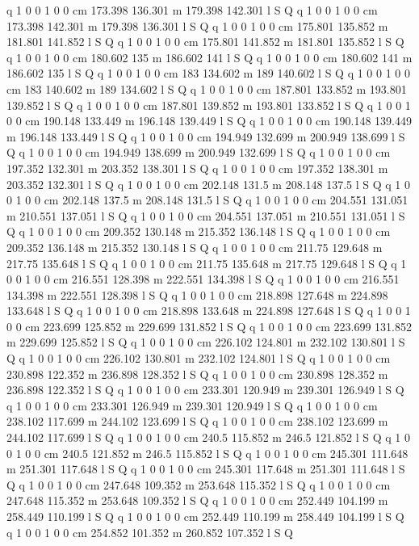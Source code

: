 q 1 0 0 1 0 0 cm
173.398 136.301 m 179.398 142.301 l S Q
q 1 0 0 1 0 0 cm
173.398 142.301 m 179.398 136.301 l S Q
q 1 0 0 1 0 0 cm
175.801 135.852 m 181.801 141.852 l S Q
q 1 0 0 1 0 0 cm
175.801 141.852 m 181.801 135.852 l S Q
q 1 0 0 1 0 0 cm
180.602 135 m 186.602 141 l S Q
q 1 0 0 1 0 0 cm
180.602 141 m 186.602 135 l S Q
q 1 0 0 1 0 0 cm
183 134.602 m 189 140.602 l S Q
q 1 0 0 1 0 0 cm
183 140.602 m 189 134.602 l S Q
q 1 0 0 1 0 0 cm
187.801 133.852 m 193.801 139.852 l S Q
q 1 0 0 1 0 0 cm
187.801 139.852 m 193.801 133.852 l S Q
q 1 0 0 1 0 0 cm
190.148 133.449 m 196.148 139.449 l S Q
q 1 0 0 1 0 0 cm
190.148 139.449 m 196.148 133.449 l S Q
q 1 0 0 1 0 0 cm
194.949 132.699 m 200.949 138.699 l S Q
q 1 0 0 1 0 0 cm
194.949 138.699 m 200.949 132.699 l S Q
q 1 0 0 1 0 0 cm
197.352 132.301 m 203.352 138.301 l S Q
q 1 0 0 1 0 0 cm
197.352 138.301 m 203.352 132.301 l S Q
q 1 0 0 1 0 0 cm
202.148 131.5 m 208.148 137.5 l S Q
q 1 0 0 1 0 0 cm
202.148 137.5 m 208.148 131.5 l S Q
q 1 0 0 1 0 0 cm
204.551 131.051 m 210.551 137.051 l S Q
q 1 0 0 1 0 0 cm
204.551 137.051 m 210.551 131.051 l S Q
q 1 0 0 1 0 0 cm
209.352 130.148 m 215.352 136.148 l S Q
q 1 0 0 1 0 0 cm
209.352 136.148 m 215.352 130.148 l S Q
q 1 0 0 1 0 0 cm
211.75 129.648 m 217.75 135.648 l S Q
q 1 0 0 1 0 0 cm
211.75 135.648 m 217.75 129.648 l S Q
q 1 0 0 1 0 0 cm
216.551 128.398 m 222.551 134.398 l S Q
q 1 0 0 1 0 0 cm
216.551 134.398 m 222.551 128.398 l S Q
q 1 0 0 1 0 0 cm
218.898 127.648 m 224.898 133.648 l S Q
q 1 0 0 1 0 0 cm
218.898 133.648 m 224.898 127.648 l S Q
q 1 0 0 1 0 0 cm
223.699 125.852 m 229.699 131.852 l S Q
q 1 0 0 1 0 0 cm
223.699 131.852 m 229.699 125.852 l S Q
q 1 0 0 1 0 0 cm
226.102 124.801 m 232.102 130.801 l S Q
q 1 0 0 1 0 0 cm
226.102 130.801 m 232.102 124.801 l S Q
q 1 0 0 1 0 0 cm
230.898 122.352 m 236.898 128.352 l S Q
q 1 0 0 1 0 0 cm
230.898 128.352 m 236.898 122.352 l S Q
q 1 0 0 1 0 0 cm
233.301 120.949 m 239.301 126.949 l S Q
q 1 0 0 1 0 0 cm
233.301 126.949 m 239.301 120.949 l S Q
q 1 0 0 1 0 0 cm
238.102 117.699 m 244.102 123.699 l S Q
q 1 0 0 1 0 0 cm
238.102 123.699 m 244.102 117.699 l S Q
q 1 0 0 1 0 0 cm
240.5 115.852 m 246.5 121.852 l S Q
q 1 0 0 1 0 0 cm
240.5 121.852 m 246.5 115.852 l S Q
q 1 0 0 1 0 0 cm
245.301 111.648 m 251.301 117.648 l S Q
q 1 0 0 1 0 0 cm
245.301 117.648 m 251.301 111.648 l S Q
q 1 0 0 1 0 0 cm
247.648 109.352 m 253.648 115.352 l S Q
q 1 0 0 1 0 0 cm
247.648 115.352 m 253.648 109.352 l S Q
q 1 0 0 1 0 0 cm
252.449 104.199 m 258.449 110.199 l S Q
q 1 0 0 1 0 0 cm
252.449 110.199 m 258.449 104.199 l S Q
q 1 0 0 1 0 0 cm
254.852 101.352 m 260.852 107.352 l S Q
